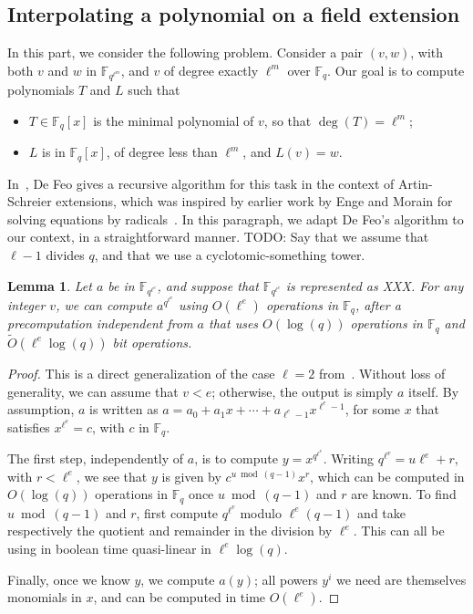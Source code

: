 \documentclass{lms}
\newcommand{\todo}[1]{{\color{red}TODO: #1}}
\newtheorem{lem}[thm]{Lemma}
\newcommand{\F}{\mathbb{F}}
\begin{document}
\subsection{Interpolating a polynomial on a field extension}

In this part, we consider the following problem. Consider a pair $(v,
w)$, with both $v$ and $w$ in $\F_{q^{\ell^m}}$, and $v$ of degree exactly
$\ell^m$ over $\F_q$. Our goal is to
compute polynomials $T$ and $L$ such that
\begin{itemize}
\item $T \in \F_q[x]$ is the minimal polynomial of $v$, so that $\deg(T) = \ell^m$;
\item $L$ is in $\F_q[x]$, of degree less than $\ell^m$, and $L(v)=w$.
\end{itemize}
In~\cite{df10}, De Feo gives a recursive algorithm for this task in the
context of Artin-Schreier extensions, which was inspired by earlier
work by Enge and Morain for solving equations by radicals~\cite{enge+morain03}.
In this paragraph, we adapt De Feo's algorithm to our context, in a straightforward manner. 
\todo{Say that we assume that $\ell-1$ divides $q$, and that we
use a cyclotomic-something tower.}



\begin{lem}\label{lemma:frob-ell}
  Let $a$ be in $\F_{q^{\ell^e}}$, and suppose that $\F_{q^{\ell^e}}$
  is represented as XXX. For any integer $v$, we can compute
  $a^{q^{\ell^v}}$ using $O(\ell^e)$ operations in $\F_q$, after a
  precomputation independent from $a$ that uses $O(\log(q))$
  operations in $\F_q$ and $\tilde{O}(\ell^e \log(q))$ bit operations.
\end{lem}
\begin{proof}
  This is a direct generalization of the case $\ell=2$ from~\cite{DoSc12}.
  Without loss of generality, we can assume that $v < e$; otherwise,
  the output is simply $a$ itself. By assumption, $a$ is written as
  $a =a_0 + a_1 x + \cdots + a_{\ell^e-1} x^{\ell^e-1}$, for some $x$
  that satisfies $x^{\ell^e}=c$, with $c$ in $\F_q$. 

  The first step, independently of $a$, is to compute
  $y=x^{q^{\ell^v}}$. Writing $q^{\ell^v} = u \ell^e + r$, with $r <
  \ell^e$, we see that $y$ is given by $c^{u \bmod (q-1)}x^r$, which
  can be computed in $O(\log(q))$ operations in $\F_q$ once $u \bmod
  (q-1)$ and $r$ are known.  To find $u \bmod (q-1)$ and $r$, first
  compute $q^{\ell^v}$ modulo $\ell^e(q-1)$ and take respectively the
  quotient and remainder in the division by $\ell^e$. This can all be
  using in boolean time quasi-linear in $\ell^e \log(q)$.

  Finally, once we know $y$, we compute $a(y)$; all powers $y^i$ we need
  are themselves monomials in $x$, and can be computed in time $O(\ell^e)$.
\end{proof}
\end{document}

